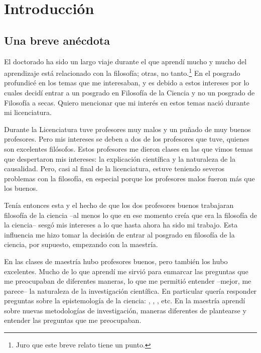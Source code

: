
\chapter{Introducción}
\label{ch:introduction}


\section{Una breve anécdota}

\noindent El doctorado ha sido un largo viaje durante el que aprendí mucho y mucho del aprendizaje está relacionado con la filosofía; otras, no tanto.\footnote{Juro que este breve relato tiene un punto.}
En el posgrado profundicé en los temas que me interesaban, y es debido a estos intereses por lo cuales decidí entrar a un posgrado en Filosofía de la Ciencia y no un posgrado de Filosofía a secas.
Quiero mencionar que mi interés en estos temas nació durante mi licenciatura.

Durante la Licenciatura tuve profesores muy malos y un puñado de muy buenos profesores.
Pero mis intereses se deben a dos de los profesores que tuve, quienes son excelentes filósofos.
Estos profesores me dieron clases en las que vimos temas que despertaron mis intereses: la explicación científica y la naturaleza de la causalidad.
Pero, casi al final de la licenciatura, estuve teniendo severos problemas con la filosofía, en especial porque los profesores malos fueron más que los buenos.

Tenía entonces esta  y el hecho de que los dos profesores buenos trabajaran filosofía de la ciencia --al menos lo que en ese momento creía que era la filosofía de la ciencia-- sesgó mis intereses a lo que hasta ahora ha sido mi trabajo.
Esta influencia me hizo tomar la decisión de entrar al posgrado en filosofía de la ciencia, por supuesto, empezando con la maestría.

En las clases de maestría hubo profesores buenos, pero también los hubo excelentes.
Mucho de lo que aprendí me sirvió para enmarcar las preguntas que me preocupaban de diferentes maneras, lo que me permitió entender --mejor, me parece-- la naturaleza de la investigación científica.
En particular quería responder preguntas sobre la epistemología de la ciencia: , , , etc.
En la maestría aprendí sobre nuevas metodologías de investigación, maneras diferentes de plantearse y entender las preguntas que me preocupaban.

